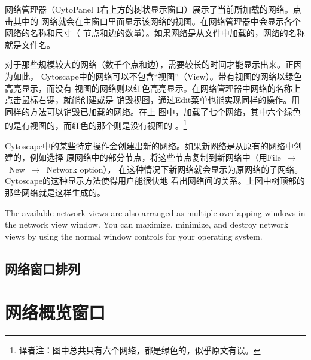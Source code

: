     网络管理器（CytoPanel 1右上方的树状显示窗口）展示了当前所加载的网络。点击其中的
    网络就会在主窗口里面显示该网络的视图。在网络管理器中会显示各个网络的名称和尺寸（
    节点和边的数量）。如果网络是从文件中加载的，网络的名称就是文件名。
    
    对于那些规模较大的网络（数千个点和边），需要较长的时间才能显示出来。正因为如此， 
    Cytoscape中的网络可以不包含“视图”（View）。带有视图的网络以绿色高亮显示，而没有
    视图的网络则以红色高亮显示。在网络管理器中网络的名称上点击鼠标右键，就能创建或是
    销毁视图，通过Edit菜单也能实现同样的操作。用同样的方法可以销毁已加载的网络。在上
    图中，加载了七个网络，其中六个绿色的是有视图的，而红色的那个则是没有视图的 
    。\footnote{译者注：图中总共只有六个网络，都是绿色的，似乎原文有误。}

Cytoscape中的某些特定操作会创建出新的网络。如果新网络是从原有的网络中创建的，例如选择
原网络中的部分节点，将这些节点复制到新网络中（用File~$\to$~New~$\to$~Network option），
在这种情况下新网络就会显示为原网络的子网络。Cytoscape的这种显示方法使得用户能很快地
看出网络间的关系。上图中树顶部的那些网络就是这样生成的。

The available network views are also arranged as multiple overlapping windows in
the network view window. You can maximize, minimize, and destroy network views by
using the normal window controls for your operating system.

    \subsection{网络窗口排列}


\section{网络概览窗口}
	




